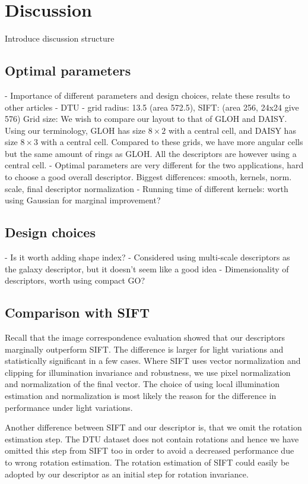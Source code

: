 \documentclass[thesis.tex]{subfiles}
\begin{document}
\chapter{Discussion}

Introduce discussion structure

\section{Optimal parameters}

- Importance of different parameters and design choices, relate these results to other articles
	- DTU
		- grid radius: 13.5 (area 572.5), SIFT: (area 256, 24x24 give 576)
		Grid size:
		We wish to compare our layout to that of GLOH and DAISY. Using our terminology, GLOH has size $8\times2$ with a central cell, and DAISY has size $8 \times 3$ with a central cell. Compared to these grids, we have more angular cells but the same amount of rings as GLOH. All the descriptors are however using a central cell.
- Optimal parameters are very different for the two applications, hard to choose a good overall descriptor. Biggest differences: smooth, kernels, norm. scale, final descriptor normalization
- Running time of different kernels: worth using Gaussian for marginal improvement?

\section{Design choices}

- Is it worth adding shape index?
- Considered using multi-scale descriptors as the galaxy descriptor, but it doesn't seem like a good idea
- Dimensionality of descriptors, worth using compact GO?
		
\section{Comparison with SIFT}
Recall that the image correspondence evaluation showed that our descriptors marginally outperform SIFT. The difference is larger for light variations and statistically significant in a few cases. Where SIFT uses vector normalization and clipping for illumination invariance and robustness, we use pixel normalization and normalization of the final vector. The choice of using local illumination estimation and normalization is most likely the reason for the difference in performance under light variations.

Another difference between SIFT and our descriptor is, that we omit the rotation estimation step. The DTU dataset does not contain rotations and hence we have omitted this step from SIFT too in order to avoid a decreased performance due to wrong rotation estimation. The rotation estimation of SIFT could easily be adopted by our descriptor as an initial step for rotation invariance.
\end{document}
